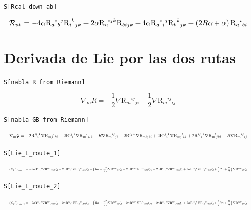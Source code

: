 \documentclass[11pt,a4paper]{article}
\begin{document}
\noindent\texttt{S[Rcal\_down\_ab]}

\[
\resizebox{\textwidth}{!}{$\displaystyle \mathcal{R}_{ab} = -4\alpha\mathrm{R}{}_{a}{}^{i}{}_{b}{}^{j}\mathrm{R}{}_{i}{}^{k}{}_{jk} + 2\alpha\mathrm{R}{}_{a}{}^{ijk}\mathrm{R}{}_{bijk} + 4\alpha\mathrm{R}{}_{a}{}^{i}{}_{i}{}^{j}\mathrm{R}{}_{b}{}^{k}{}_{jk} + \left(2 R \alpha + \alpha\right)\mathrm{R}{}_{a}{}^{i}{}_{bi}$}
\]


\section*{Derivada de Lie por las dos rutas}

\noindent\texttt{S[nabla\_R\_from\_Riemann]}

\[
\boxed{\nabla_m R = -\frac{1}{2}\nabla \mathrm{R}{}_{m}{}^{ij}{}_{ji} + \frac{1}{2}\nabla \mathrm{R}{}_{m}{}^{ij}{}_{ij}}
\]


\noindent\texttt{S[nabla\_GB\_from\_Riemann]}

\[
\resizebox{\textwidth}{!}{$\displaystyle \nabla_m \mathcal G = -2\mathrm{R}{}^{ij}{}_{i}{}^{k}\nabla \mathrm{R}{}_{mj}{}^{l}{}_{kl} - 2\mathrm{R}{}^{ij}{}_{i}{}^{k}\nabla \mathrm{R}{}_{m}{}^{l}{}_{jlk} - R\nabla \mathrm{R}{}_{m}{}^{ij}{}_{ji} + 2\mathrm{R}{}^{ijkl}\nabla \mathrm{R}{}_{mijkl} + 2\mathrm{R}{}^{ij}{}_{i}{}^{k}\nabla \mathrm{R}{}_{mj}{}^{l}{}_{lk} + 2\mathrm{R}{}^{ij}{}_{i}{}^{k}\nabla \mathrm{R}{}_{m}{}^{l}{}_{jkl} + R\nabla \mathrm{R}{}_{m}{}^{ij}{}_{ij}$}
\]


\noindent\texttt{S[Lie\_L\_route\_1]}

\[
\resizebox{\textwidth}{!}{$\displaystyle \left(\mathcal{L}_{\xi}L\right)_{\mathrm{ruta\ 1}} = -2\alpha\mathrm{R}{}^{ij}{}_{i}{}^{k}\nabla \mathrm{R}{}^{lm}{}_{jmk}\xi{}_{l} - 2\alpha\mathrm{R}{}^{ij}{}_{i}{}^{k}\nabla \mathrm{R}{}^{l}{}_{j}{}^{m}{}_{km}\xi{}_{l} - \left(R \alpha + \frac{\alpha}{2}\right)\nabla \mathrm{R}{}^{ijk}{}_{kj}\xi{}_{i} + 2\alpha\mathrm{R}{}^{ijkl}\nabla \mathrm{R}{}^{m}{}_{ijkl}\xi{}_{m} + 2\alpha\mathrm{R}{}^{ij}{}_{i}{}^{k}\nabla \mathrm{R}{}^{lm}{}_{jkm}\xi{}_{l} + 2\alpha\mathrm{R}{}^{ij}{}_{i}{}^{k}\nabla \mathrm{R}{}^{l}{}_{j}{}^{m}{}_{mk}\xi{}_{l} + \left(R \alpha + \frac{\alpha}{2}\right)\nabla \mathrm{R}{}^{ijk}{}_{jk}\xi{}_{i}$}
\]


\noindent\texttt{S[Lie\_L\_route\_2]}

\[
\resizebox{\textwidth}{!}{$\displaystyle \left(\mathcal{L}_{\xi}L\right)_{\mathrm{ruta\ 2}} = -2\alpha\mathrm{R}{}^{ij}{}_{i}{}^{k}\nabla \mathrm{R}{}^{lm}{}_{jmk}\xi{}_{l} - 2\alpha\mathrm{R}{}^{ij}{}_{i}{}^{k}\nabla \mathrm{R}{}^{l}{}_{j}{}^{m}{}_{km}\xi{}_{l} - \left(R \alpha + \frac{\alpha}{2}\right)\nabla \mathrm{R}{}^{ijk}{}_{kj}\xi{}_{i} + 2\alpha\mathrm{R}{}^{ijkl}\nabla \mathrm{R}{}^{m}{}_{ijkl}\xi{}_{m} + 2\alpha\mathrm{R}{}^{ij}{}_{i}{}^{k}\nabla \mathrm{R}{}^{lm}{}_{jkm}\xi{}_{l} + 2\alpha\mathrm{R}{}^{ij}{}_{i}{}^{k}\nabla \mathrm{R}{}^{l}{}_{j}{}^{m}{}_{mk}\xi{}_{l} + \left(R \alpha + \frac{\alpha}{2}\right)\nabla \mathrm{R}{}^{ijk}{}_{jk}\xi{}_{i}$}
\]
\end{document}
